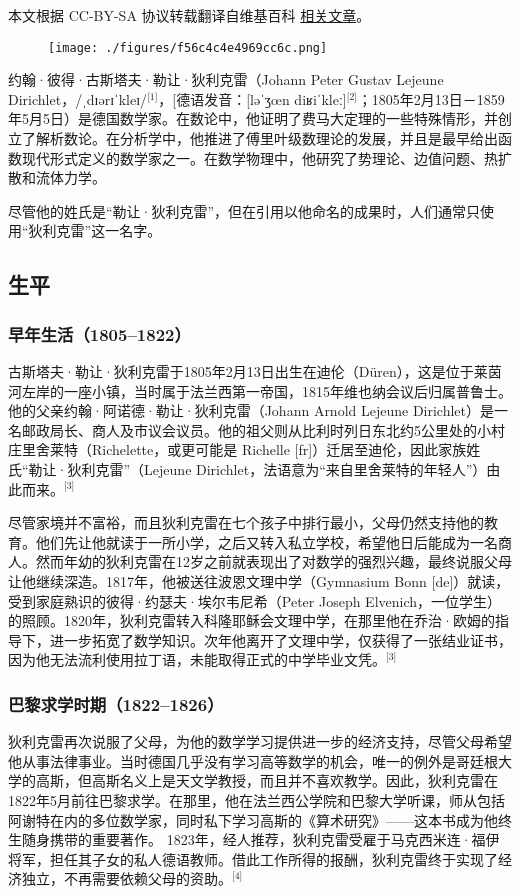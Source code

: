 
本文根据 CC-BY-SA 协议转载翻译自维基百科 \href{https://en.wikipedia.org/wiki/Peter_Gustav_Lejeune_Dirichlet}{相关文章}。

\begin{figure}[ht]
\centering
\texttt{[image: ./figures/f56c4c4e4969cc6c.png]}
\caption{} \label{fig_YBGL_3}
\end{figure}
约翰·彼得·古斯塔夫·勒让·狄利克雷（Johann Peter Gustav Lejeune Dirichlet，/ˌdɪərɪˈkleɪ/\(^\text{[1]}\)，[德语发音：[ləˈʒœn diʁiˈkleː]\(^\text{[2]}\)；1805年2月13日－1859年5月5日）是德国数学家。在数论中，他证明了费马大定理的一些特殊情形，并创立了解析数论。在分析学中，他推进了傅里叶级数理论的发展，并且是最早给出函数现代形式定义的数学家之一。在数学物理中，他研究了势理论、边值问题、热扩散和流体力学。

尽管他的姓氏是“勒让·狄利克雷”，但在引用以他命名的成果时，人们通常只使用“狄利克雷”这一名字。
\subsection{生平}
\subsubsection{早年生活（1805–1822）}
古斯塔夫·勒让·狄利克雷于1805年2月13日出生在迪伦（Düren），这是位于莱茵河左岸的一座小镇，当时属于法兰西第一帝国，1815年维也纳会议后归属普鲁士。他的父亲约翰·阿诺德·勒让·狄利克雷（Johann Arnold Lejeune Dirichlet）是一名邮政局长、商人及市议会议员。他的祖父则从比利时列日东北约5公里处的小村庄里舍莱特（Richelette，或更可能是 Richelle [fr]）迁居至迪伦，因此家族姓氏“勒让·狄利克雷”（Lejeune Dirichlet，法语意为“来自里舍莱特的年轻人”）由此而来。\(^\text{[3]}\)

尽管家境并不富裕，而且狄利克雷在七个孩子中排行最小，父母仍然支持他的教育。他们先让他就读于一所小学，之后又转入私立学校，希望他日后能成为一名商人。然而年幼的狄利克雷在12岁之前就表现出了对数学的强烈兴趣，最终说服父母让他继续深造。1817年，他被送往波恩文理中学（Gymnasium Bonn [de]）就读，受到家庭熟识的彼得·约瑟夫·埃尔韦尼希（Peter Joseph Elvenich，一位学生）的照顾。1820年，狄利克雷转入科隆耶稣会文理中学，在那里他在乔治·欧姆的指导下，进一步拓宽了数学知识。次年他离开了文理中学，仅获得了一张结业证书，因为他无法流利使用拉丁语，未能取得正式的中学毕业文凭。\(^\text{[3]}\)
\subsubsection{巴黎求学时期（1822–1826）}
狄利克雷再次说服了父母，为他的数学学习提供进一步的经济支持，尽管父母希望他从事法律事业。当时德国几乎没有学习高等数学的机会，唯一的例外是哥廷根大学的高斯，但高斯名义上是天文学教授，而且并不喜欢教学。因此，狄利克雷在1822年5月前往巴黎求学。在那里，他在法兰西公学院和巴黎大学听课，师从包括阿谢特在内的多位数学家，同时私下学习高斯的《算术研究》——这本书成为他终生随身携带的重要著作。
1823年，经人推荐，狄利克雷受雇于马克西米连·福伊将军，担任其子女的私人德语教师。借此工作所得的报酬，狄利克雷终于实现了经济独立，不再需要依赖父母的资助。\(^\text{[4]}\)

